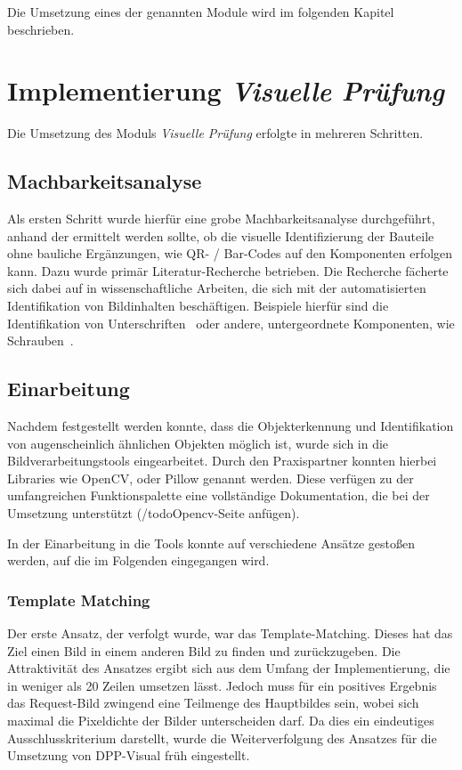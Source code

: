\documentclass[
    type=Projektarbeit,
    status=draft, %
    language=german, %
    bibengine=bibtex,
]{unibwm-inf-thesis}
\begin{document}
    Die Umsetzung eines der genannten Module wird im folgenden Kapitel beschrieben.


    \chapter{Implementierung \textit{Visuelle Prüfung}}
    Die Umsetzung des Moduls \textit{Visuelle Prüfung} erfolgte in mehreren Schritten.
    \section{Machbarkeitsanalyse}
    Als ersten Schritt wurde hierfür eine grobe Machbarkeitsanalyse durchgeführt, anhand der ermittelt werden sollte,
    ob die visuelle Identifizierung der Bauteile ohne bauliche Ergänzungen, wie QR- / Bar-Codes auf den Komponenten erfolgen kann.
    Dazu wurde primär Literatur-Recherche betrieben.
    Die Recherche fächerte sich dabei auf in wissenschaftliche Arbeiten, die sich mit der automatisierten Identifikation von Bildinhalten beschäftigen.
    Beispiele hierfür sind die Identifikation von Unterschriften~\cite{Munich2003} oder andere, untergeordnete Komponenten, wie Schrauben~\cite{Lehr2019}.
    \section{Einarbeitung}
    Nachdem festgestellt werden konnte, dass die Objekterkennung und Identifikation von augenscheinlich ähnlichen Objekten möglich ist, wurde sich in die Bildverarbeitungstools eingearbeitet.
    Durch den Praxispartner konnten hierbei Libraries wie OpenCV, oder Pillow genannt werden.
    Diese verfügen zu der umfangreichen Funktionspalette eine vollständige Dokumentation, die bei der Umsetzung unterstützt (/todo{Opencv-Seite anfügen}).

    In der Einarbeitung in die Tools konnte auf verschiedene Ansätze gestoßen werden, auf die im Folgenden eingegangen wird.

    \subsection{Template Matching}
    Der erste Ansatz, der verfolgt wurde, war das Template-Matching.
    Dieses hat das Ziel einen Bild in einem anderen Bild zu finden und zurückzugeben.\cite{CV2TemplateMatching2022}
    Die Attraktivität des Ansatzes ergibt sich aus dem Umfang der Implementierung, die in weniger als 20 Zeilen umsetzen lässt.
    Jedoch muss für ein positives Ergebnis das Request-Bild zwingend eine Teilmenge des Hauptbildes sein, wobei sich maximal die Pixeldichte der Bilder unterscheiden darf.
    Da dies ein eindeutiges Ausschlusskriterium darstellt, wurde die Weiterverfolgung des Ansatzes für die Umsetzung von DPP-Visual früh eingestellt.
\end{document}
